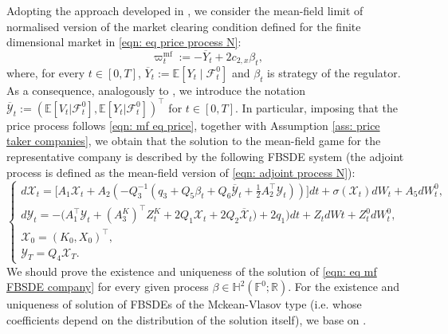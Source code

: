 \documentclass[10pt,a4paper]{amsart}
\numberwithin{equation}{section}
\newcommand{\wmf}{\varpi^{\text{mf}}}
\newcommand{\E}{\mathbb{E}}
\newcommand{\F}{\mathbb{F}}
\newcommand{\R}{\mathbb{R}}
\newcommand{\ItF}{\mathcal{F}}
\renewcommand{\bar}{\overline}
\begin{document}
Adopting the approach developed in \cite{fujii2022mean}, we consider the mean-field limit of normalised version of the market clearing condition defined for the finite dimensional market in \eqref{eqn: eq price process N}:
\begin{equation}
\label{eqn: mf eq price}
\wmf_t :=  - \overline{Y}_t + 2c_{2,x} \beta_t,
\end{equation}
where, for every $t \in [0,T]$, $\overline{Y}_t := \E[Y_t\mid \ItF^0_t]$ and $\beta_t$ is strategy of the regulator. As a consequence, analogously to \cite[Section 6]{del2024mean}, we introduce the notation $\overline{\mathcal{Y}}_t := (\E[V_t|\ItF^0_t], \E[Y_t|\ItF^0_t])^\top$ for $t\in[0,T]$. In particular, imposing that the price process follows \eqref{eqn: mf eq price}, together with Assumption \ref{ass: price taker companies}, we obtain that the solution to the mean-field game for the representative company is described by the following FBSDE system (the adjoint process is defined as the mean-field version of \eqref{eqn: adjoint process N}):
\begin{equation}
\label{eqn: eq mf FBSDE company} 
\begin{cases}
d\mathcal{X}_t = \big[ A_1 \mathcal{X}_t + A_2( -Q_3^{-1} ( q_3  + Q_5\beta_t+ Q_6\overline{\mathcal{Y}}_t+ \frac{1}{2}A_2^\top \mathcal{Y}_t))\big] dt + \sigma(\mathcal{X}_t)dW_t + A_5dW^0_t,\\
d\mathcal{Y}_t = -\big( A_1^\top \mathcal{Y}_t + (A^K_3)^\top Z^{K}_t + 2Q_1\mathcal{X}_t + 2Q_2 \bar{\mathcal{X}}_t) + 2q_1 \big)dt + Z_t dWt + Z^{0}_t dW^0_t ,\\
\mathcal{X}_0 = (K_0,X_0)^\top,\\
\mathcal{Y}_T = Q_4\mathcal{X}_T.
\end{cases}
\end{equation}
We should prove the existence and uniqueness of the solution of \eqref{eqn: eq mf FBSDE company} for every given process $\beta\in\mathbb{H}^2(\F^0;\R)$. For the existence and uniqueness of solution of FBSDEs of the Mckean-Vlasov type (i.e. whose coefficients depend on the distribution of the solution itself), we base on \cite{carmona2013mean,carmona2015forward}.
\end{document}
